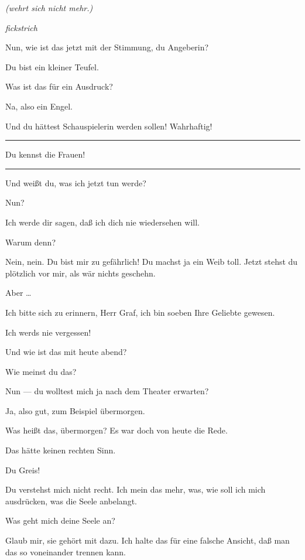 \documentclass[
	final,
	a4paper,
	ngerman,
	mpinclude = true, %
	twoside = true,
	open = right,
	cleardoublepage = plain,
	DIV = 13,
	BCOR = 1cm,
	titlepage = firstiscover,
	]{scrbook}
\newcommand{\direction}[1]{\textit{(#1)}}
\newcommand{\hiat}{%
	\begin{center}
		\tiny
		\raisebox{0.5ex}{\rule{0.3\linewidth}{0.4pt}}
		\textit{fickstrich}
		\raisebox{0.5ex}{\rule{0.3\linewidth}{0.4pt}}
	\end{center}
}
\newenvironment{deletion}{%
		\vspace{0.25\baselineskip}
		\hrule
		\vspace{0.25\baselineskip}
		\color{darkgray}
	}{
		\color{black}
		\vspace{0.25\baselineskip}
		\hrule 
		\vspace{0.25\baselineskip}
	}
\newcommand{\thecharacter}[1]{\textup{\textsc{#1}}\xspace}
\newcommand{\theschauspielerin}{\thecharacter{Daniela}}
\newcommand{\theentrepeneurin}{\thecharacter{Katerina Albrecht}}
\newcommand{\character}[1]{\item[#1:]}
\newcommand{\schauspielerin}{\character{\theschauspielerin}}
\newcommand{\entrepeneurin}{\character{\theentrepeneurin}}
\begin{document}
\begin{play}
	\entrepeneurin
	\direction{wehrt sich nicht mehr.}

	\hiat

	\schauspielerin
	Nun, wie ist das jetzt mit der Stimmung, du Angeberin?

	\entrepeneurin
	Du bist ein kleiner Teufel.

	\schauspielerin
	Was ist das für ein Ausdruck?

	\entrepeneurin
	Na, also ein Engel.

	\schauspielerin
	Und du hättest Schauspielerin werden sollen! Wahrhaftig!
	\begin{deletion}
		Du kennst die Frauen!
	\end{deletion}
	Und weißt du, was ich jetzt tun werde?

	\entrepeneurin
	Nun?

	\schauspielerin
	Ich werde dir sagen, daß ich dich nie wiedersehen will.

	\entrepeneurin
	Warum denn?

	\schauspielerin
	Nein, nein. Du bist mir zu gefährlich! Du machst ja ein Weib toll. Jetzt stehst du plötzlich vor mir, als wär nichts geschehn.

	\entrepeneurin
	Aber \ldots{}

	\schauspielerin
	Ich bitte sich zu erinnern, Herr Graf, ich bin soeben Ihre Geliebte gewesen.

	\entrepeneurin
	Ich werds nie vergessen!

	\schauspielerin
	Und wie ist das mit heute abend?

	\entrepeneurin
	Wie meinst du das?

	\schauspielerin
	Nun --- du wolltest mich ja nach dem Theater erwarten?

	\entrepeneurin
	Ja, also gut, zum Beispiel übermorgen.

	\schauspielerin
	Was heißt das, übermorgen? Es war doch von heute die Rede.

	\entrepeneurin
	Das hätte keinen rechten Sinn.

	\schauspielerin
	Du Greis!

	\entrepeneurin
	Du verstehst mich nicht recht. Ich mein das mehr, was, wie soll ich mich ausdrücken, was die Seele anbelangt.

	\schauspielerin
	Was geht mich deine Seele an?

	\entrepeneurin
	Glaub mir, sie gehört mit dazu. Ich halte das für eine falsche Ansicht, daß man das so voneinander trennen kann.


\end{play}
\end{document}
